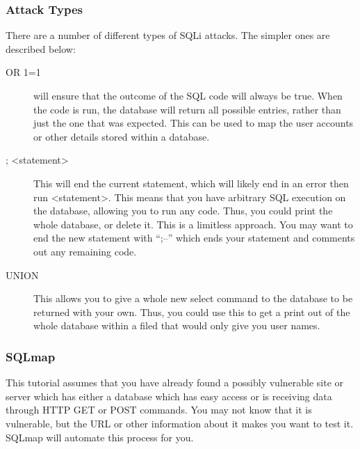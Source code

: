 		\subsubsection{Attack Types}
			There are a number of different types of SQLi attacks. 
			The simpler ones are described below:
			\begin{description}
				\item[OR 1=1] will ensure that the outcome of the SQL code will always be true. 
					When the code is run, the database will return all possible entries, rather than just the one that was expected. 
					This can be used to map the user accounts or other details stored within a database. 
				\item[; <statement>] This will end the current statement, which will likely end in an error then run <statement>.
					This means that you have arbitrary SQL execution on the database, allowing you to run any code. 
					Thus, you could print the whole database, or delete it. 
					This is a limitless approach. 
					You may want to end the new statement with ``;--'' which ends your statement and comments out any remaining code. 
				\item[UNION] This allows you to give a whole new select command to the database to be returned with your own. 
					Thus, you could use this to get a print out of the whole database within a filed that would only give you user names. 

			\end{description}
		\subsubsection{SQLmap}
			This tutorial assumes that you have already found a possibly vulnerable site or server which has either a database which has easy access or is receiving data through HTTP GET or POST commands. 
			You may not know that it is vulnerable, but the URL or other information about it makes you want to test it. 
			SQLmap will automate this process for you. 

